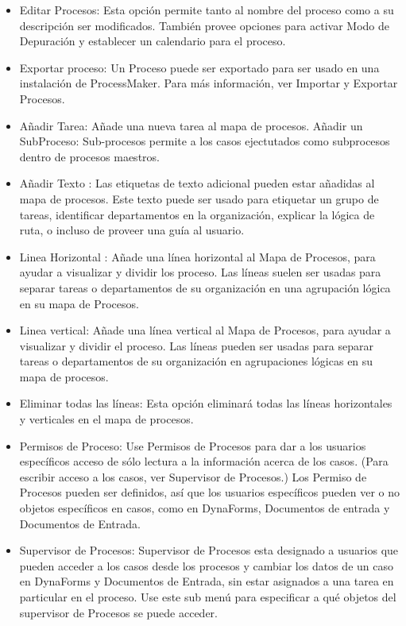 \begin{itemize}
\item  Editar Procesos: Esta opción permite tanto al nombre del proceso como a su descripción ser modificados. También provee opciones para activar Modo de Depuración y establecer un calendario para el proceso.
\item Exportar proceso: Un Proceso puede ser exportado para ser usado en una instalación de ProcessMaker. Para más información, ver Importar y Exportar Procesos.
\item Añadir Tarea: Añade una nueva tarea al mapa de procesos.
Añadir un SubProceso: Sub-procesos permite a los casos ejectutados como subprocesos dentro de procesos maestros.
\item Añadir Texto : Las etiquetas de texto adicional pueden estar añadidas al mapa de procesos. Este texto puede ser usado para etiquetar un grupo de tareas, identificar departamentos en la organización, explicar la lógica de ruta, o incluso de proveer una guía al usuario.

\item Linea Horizontal : Añade una línea horizontal al Mapa de Procesos, para ayudar a visualizar y dividir los proceso. Las líneas suelen ser usadas para separar tareas o departamentos de su organización en una agrupación lógica en su mapa de Procesos.

\item Linea vertical: Añade una línea vertical al Mapa de Procesos, para ayudar a visualizar y dividir el proceso. Las líneas pueden ser usadas para separar tareas o departamentos de su organización en agrupaciones lógicas en su mapa de procesos.

\item Eliminar todas las líneas: Esta opción eliminará todas las líneas horizontales y verticales en el mapa de procesos.

\item Permisos de Proceso: Use Permisos de Procesos para dar a los usuarios específicos acceso de sólo lectura a la información acerca de los casos. (Para escribir acceso a los casos, ver Supervisor de Procesos.) Los Permiso de Procesos pueden ser definidos, así que los usuarios específicos pueden ver o no objetos específicos en casos, como en DynaForms, Documentos de entrada y Documentos de Entrada.

\item Supervisor de Procesos: Supervisor de Procesos esta designado a usuarios que pueden acceder a los casos desde los procesos y cambiar los datos de un caso en DynaForms y Documentos de Entrada, sin estar asignados a una tarea en particular en el proceso. Use este sub menú para especificar a qué objetos del supervisor de Procesos se puede acceder.


\end{itemize}
